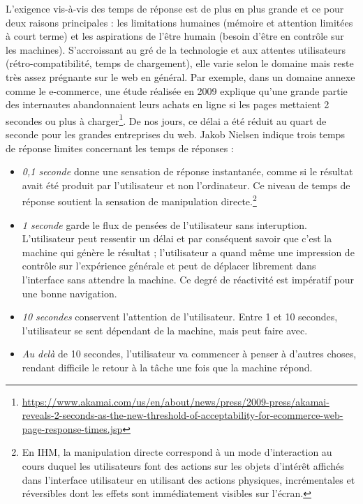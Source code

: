 L'exigence vis-à-vis des temps de réponse est de plus en plus 
grande et ce pour deux raisons principales : les limitations humaines (mémoire et 
attention limitées 
à court terme) et les aspirations de l'être humain (besoin d'être en contrôle sur les 
machines). S'accroissant au gré de la technologie et aux attentes 
utilisateurs (rétro-compatibilité, temps de 
chargement), elle varie selon le domaine mais reste très assez prégnante sur le 
web en général. 
Par exemple, dans un domaine annexe comme le e-commerce, une étude réalisée 
en 2009 explique qu’une grande partie des internautes abandonnaient leurs achats 
en ligne si les pages mettaient 2 secondes ou plus à charger\footnote{\url{https://www.akamai.com/us/en/about/news/press/2009-press/akamai-reveals-2-seconds-as-the-new-threshold-of-acceptability-for-ecommerce-web-page-response-times.jsp}}. De nos jours, ce 
délai a été réduit au quart de seconde pour les grandes entreprises du web. Jakob 
Nielsen \cite{Nielsen1993a} indique trois temps de réponse limites concernant les 
temps de réponses :
\begin{itemize}
	\item \textit{0,1 seconde} donne une sensation de réponse instantanée, comme 
	si le 
	résultat avait été produit par l'utilisateur et non l'ordinateur. Ce niveau de temps 
	de réponse soutient la sensation de manipulation directe.\footnote{En IHM, la 
		manipulation directe correspond à un mode d'interaction au cours duquel les 
		utilisateurs font des actions sur les objets d'intérêt affichés dans l'interface 
		utilisateur en utilisant des actions physiques, incrémentales et réversibles 
		dont 
		les effets sont immédiatement visibles sur l'écran.} 
	\item \textit{1 seconde} garde le flux de pensées de l'utilisateur sans 
	interuption. 
	L'utilisateur peut ressentir un délai et par conséquent savoir que c'est la 
	machine qui génère le résultat ; l'utilisateur a quand même une impression de 
	contrôle sur l'expérience générale et peut de déplacer librement dans l'interface 
	sans attendre la machine. Ce degré de réactivité est impératif pour une bonne 
	navigation.
	\item \textit{10 secondes} conservent l'attention de l'utilisateur. Entre 1 et 10 
	secondes, l'utilisateur se sent dépendant de la machine, mais peut faire avec. 
	\item \textit{Au delà} de 10 secondes, l'utilisateur va commencer à penser à d'autres choses, rendant difficile 
	le retour à la tâche une fois que la machine répond.
\end{itemize} 
